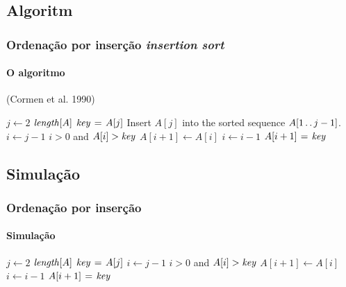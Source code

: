 \documentclass{beamer}
\begin{document}
\subsection{Algoritm}

\begin{frame}

  \frametitle{Ordenação por inserção \textit{insertion sort}}
  \framesubtitle{O algoritmo}

(Cormen et al. 1990)

\begin{codebox}
\li \For $j \gets 2$ \To $\id{length}[A]$
\li     \Do
$\id{key} \gets A[j]$
\zi
\Comment Insert $A[j]$ into the sorted sequence
    $A[1 \mathinner{\ldotp\ldotp} j-1]$.
\li $i \gets j-1$
\li \While $i > 0$ and $A[i] > \id{key}$
\li    \Do
        $A[i+1] \gets A[i]$
\li     $i \gets i-1$
    \End
\li $A[i+1] \gets \id{key}$
\End
\end{codebox}  

\end{frame}

\subsection{Simulação}

\begin{frame}

  \frametitle{Ordenação por inserção}
  \framesubtitle{Simulação}
\begin{small}
\begin{codebox}
\li \For $j \gets 2$ \To $\id{length}[A]$
\li     \Do
$\id{key} \gets A[j]$
\li $i \gets j-1$
\li \While $i > 0$ and $A[i] > \id{key}$
\li    \Do
        $A[i+1] \gets A[i]$
\li     $i \gets i-1$
    \End
\li $A[i+1] \gets \id{key}$
\End
\end{codebox}  
\end{small}
\end{frame}
\end{document}
